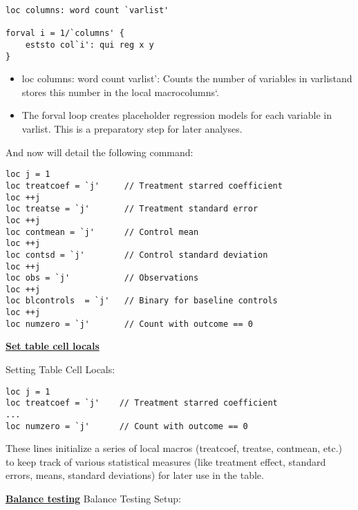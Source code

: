\documentclass{article}
\begin{document}
\begin{mdframed}
\begin{verbatim}
loc columns: word count `varlist' 

forval i = 1/`columns' { 
    eststo col`i': qui reg x y
}
\end{verbatim}
\end{mdframed}

\begin{itemize}
    \item loc columns: word count varlist': Counts the number of variables in varlistand stores this number in the local macrocolumns`.
    \item The forval loop creates placeholder regression models for each variable in varlist. This is a preparatory step for later analyses.
\end{itemize}

And now will detail the following command: 

\begin{mdframed}
\begin{verbatim}
loc j = 1
loc treatcoef = `j'		// Treatment starred coefficient
loc ++j
loc treatse = `j'		// Treatment standard error 
loc ++j
loc contmean = `j'		// Control mean 
loc ++j
loc contsd = `j'		// Control standard deviation 
loc ++j
loc obs = `j'			// Observations 
loc ++j
loc blcontrols  = `j'	// Binary for baseline controls 
loc ++j
loc numzero = `j'		// Count with outcome == 0
\end{verbatim}
\end{mdframed}


\underline{\textbf{Set table cell locals}}

\vspace{0.3cm}Setting Table Cell Locals:

\begin{mdframed}
\begin{verbatim}
loc j = 1
loc treatcoef = `j'    // Treatment starred coefficient
...
loc numzero = `j'      // Count with outcome == 0
\end{verbatim}
\end{mdframed}

\vspace{0.2cm} These lines initialize a series of local macros (treatcoef, treatse, contmean, etc.) to keep track of various statistical measures (like treatment effect, standard errors, means, standard deviations) for later use in the table.


\underline{\textbf{Balance testing}}
\vspace{0.3cm}Balance Testing Setup:
\end{document}
